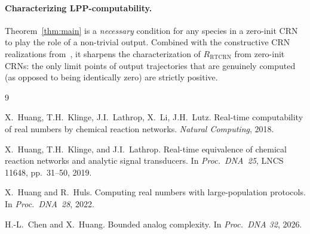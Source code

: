 \documentclass[11pt]{article}
\newcommand{\RTCRN}{R_{\mathrm{RTCRN}}}
\begin{document}
\paragraph{Characterizing LPP-computability.} Theorem~\ref{thm:main} is a
\emph{necessary} condition for any species in a zero-init CRN to play the
role of a non-trivial output. Combined with the constructive CRN
realizations from~\cite{RTCRN1,RTCRN2,LPP}, it sharpens the characterization
of $\RTCRN$ from zero-init CRNs: the only limit points of output trajectories
that are genuinely computed (as opposed to being identically zero) are
strictly positive.

\begin{thebibliography}{9}

X.~Huang, T.H.~Klinge, J.I.~Lathrop, X.~Li, J.H.~Lutz.
\newblock Real-time computability of real numbers by chemical reaction networks.
\newblock \emph{Natural Computing}, 2018.

X.~Huang, T.H.~Klinge, and J.I.~Lathrop.
\newblock Real-time equivalence of chemical reaction networks and analytic
  signal transducers.
\newblock In \emph{Proc.\ DNA~25}, LNCS 11648, pp.~31--50, 2019.

X.~Huang and R.~Huls.
\newblock Computing real numbers with large-population protocols.
\newblock In \emph{Proc.\ DNA~28}, 2022.

H.-L.~Chen and X.~Huang.
\newblock Bounded analog complexity.
\newblock In \emph{Proc.\ DNA 32}, 2026.

\end{thebibliography}
\end{document}
